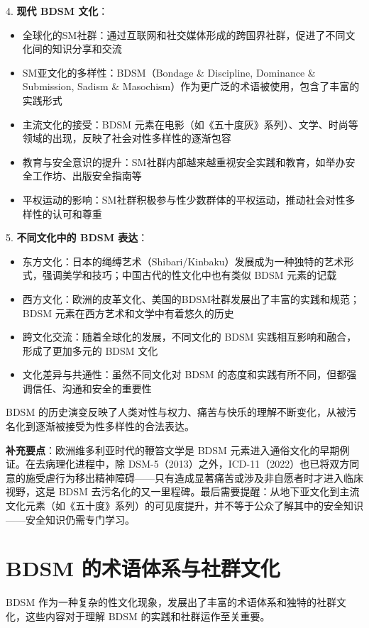 \documentclass[12pt,UTF8]{ctexbook}
\begin{document}
4. \textbf{现代 BDSM 文化}：
  \begin{itemize}
  \item 全球化的SM社群：通过互联网和社交媒体形成的跨国界社群，促进了不同文化间的知识分享和交流
  \item SM亚文化的多样性：BDSM（Bondage \& Discipline, Dominance \& Submission, Sadism \& Masochism）作为更广泛的术语被使用，包含了丰富的实践形式
  \item 主流文化的接受：BDSM 元素在电影（如《五十度灰》系列）、文学、时尚等领域的出现，反映了社会对性多样性的逐渐包容
  \item 教育与安全意识的提升：SM社群内部越来越重视安全实践和教育，如举办安全工作坊、出版安全指南等
  \item 平权运动的影响：SM社群积极参与性少数群体的平权运动，推动社会对性多样性的认可和尊重
  \end{itemize}

5. \textbf{不同文化中的 BDSM 表达}：
  \begin{itemize}
  \item 东方文化：日本的绳缚艺术（Shibari/Kinbaku）发展成为一种独特的艺术形式，强调美学和技巧；中国古代的性文化中也有类似 BDSM 元素的记载
  \item 西方文化：欧洲的皮革文化、美国的BDSM社群发展出了丰富的实践和规范；BDSM 元素在西方艺术和文学中有着悠久的历史
  \item 跨文化交流：随着全球化的发展，不同文化的 BDSM 实践相互影响和融合，形成了更加多元的 BDSM 文化
  \item 文化差异与共通性：虽然不同文化对 BDSM 的态度和实践有所不同，但都强调信任、沟通和安全的重要性
  \end{itemize}

BDSM 的历史演变反映了人类对性与权力、痛苦与快乐的理解不断变化，从被污名化到逐渐被接受为性多样性的合法表达。

\noindent\textbf{补充要点}：欧洲维多利亚时代的鞭笞文学是 BDSM 元素进入通俗文化的早期例证。在去病理化进程中，除 DSM-5（2013）之外，ICD-11\cite{who2019icd11}（2022）也已将双方同意的施受虐行为移出精神障碍——只有造成显著痛苦或涉及非自愿者时才进入临床视野，这是 BDSM 去污名化的又一里程碑。最后需要提醒：从地下亚文化到主流文化元素（如《五十度》系列）的可见度提升，并不等于公众了解其中的安全知识——安全知识仍需专门学习。

\section{BDSM 的术语体系与社群文化}

BDSM 作为一种复杂的性文化现象，发展出了丰富的术语体系和独特的社群文化，这些内容对于理解 BDSM 的实践和社群运作至关重要。
\end{document}
